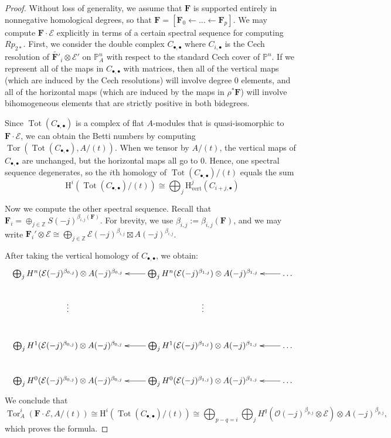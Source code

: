 \documentclass[12pt]{amsart}
\theoremstyle{definition}
\theoremstyle{remark}
\newcommand{\Tor}{\operatorname{Tor}}
\newcommand{\Tot}{\operatorname{Tot}}
\newcommand{\PP}{\mathbb{P}}
\newcommand{\HH}{\mathrm{H}}
\newcommand{\ZZ}{\mathbb{Z}}
\newcommand{\cO}{\mathcal{O}}
\newcommand{\cE}{\mathcal{E}}
\newcommand{\FF}{\mathbf{F}}
\begin{document}
\begin{proof}
Without loss of generality, we assume that $\FF$ is supported entirely in nonnegative homological degrees, so that $\FF=[\FF_0\gets \dots \gets \FF_p]$.  
We may compute $\FF\cdot \cE$ explicitly in terms of a certain spectral sequence for computing $Rp_{2*}$.  First, we consider the double complex $C_{\bullet, \bullet}$ where $C_{i,\bullet}$ is the Cech resolution of $\widetilde{\FF'}_i\otimes \cE'$ on $\PP^n_A$ with respect to the standard Cech cover of $\mathbb P^n$.  If we represent all of the maps in $C_{\bullet, \bullet}$ with matrices, then all of the vertical maps (which are induced by the Cech resolutions) will involve degree $0$ elements, and all of the horizontal maps (which are induced by the maps in $\rho^*\FF$) will involve bihomogeneous elements that are strictly positive in both bidegrees.

Since $\Tot(C_{\bullet, \bullet})$ is a complex of flat $A$-modules that is quasi-isomorphic to $\FF\cdot \cE$, we can obtain the Betti numbers by computing $\Tor(\Tot(C_{\bullet, \bullet}), A/(t))$.  When we tensor by $A/(t)$, the vertical maps of $C_{\bullet, \bullet}$ are unchanged, but the horizontal maps all go to $0$.  
Hence, one spectral sequence degenerates, so the $i$th homology of $\Tot(C_{\bullet,\bullet})/(t)$ equals the sum 
\[
\HH^i(\Tot(C_{\bullet,\bullet})/(t))\cong \bigoplus_{j} \HH^j_{\text{vert}}(C_{i+j,\bullet})
\]

Now we compute the other spectral sequence.
Recall that $\FF_i=\oplus_{j\in \ZZ} S(-j)^{\beta_{i,j}(\FF)}$.  For brevity, we use $\beta_{i,j}:=\beta_{i,j}(\FF)$, and we may write $\FF_i'\otimes \cE\cong \bigoplus_{j\in \ZZ} \cE(-j)^{\beta_{i,j}}\boxtimes A(-j)^{\beta_{i,j}}$.

After taking the vertical homology of $C_{\bullet, \bullet}$, we obtain:
\[
\xymatrix{
\bigoplus_{j} H^n(\cE(-j)^{\beta_{0,j}})\otimes A(-j)^{\beta_{0,j}}&\bigoplus_{j} H^n(\cE(-j)^{\beta_{1,j}})\otimes A(-j)^{\beta_{1,j}}\ar[l]&\dots\ar[l]\\
\vdots & \vdots&\\
\bigoplus_{j} H^1(\cE(-j)^{\beta_{0,j}})\otimes A(-j)^{\beta_{0,j}}&\bigoplus_{j} H^1(\cE(-j)^{\beta_{1,j}})\otimes A(-j)^{\beta_{1,j}}\ar[l]&\dots\ar[l]\\
\bigoplus_{j} H^0( \cE(-j)^{\beta_{0,j}})\otimes A(-j)^{\beta_{0,j}}&\bigoplus_{j} H^0(\cE(-j)^{\beta_{1,j}})\otimes A(-j)^{\beta_{1,j}}\ar[l]&\dots\ar[l]
}
\]
We conclude that
\[
\Tor^i_A(\FF\cdot \cE, A/(t))\cong \HH^i(\Tot(C_{\bullet,\bullet})/(t))\cong \bigoplus_{p-q=i} \bigoplus_{j} H^q(\cO(-j)^{\beta_{p,j}}\otimes \cE)\otimes A(-j)^{\beta_{p,j}},
\]
which proves the formula.
\end{proof}
\end{document}
